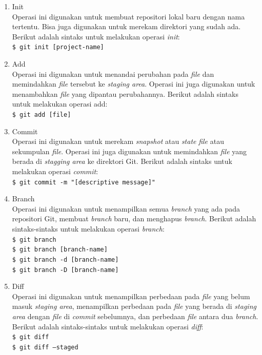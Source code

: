 \begin{enumerate}
\item Init\\
Operasi ini digunakan untuk membuat repositori lokal baru dengan nama tertentu. Bisa juga digunakan untuk merekam direktori yang sudah ada. Berikut adalah sintaks untuk melakukan operasi  \textit{init}:\\
\texttt{\$ git init [project-name]}  
\item Add\\
Operasi ini digunakan untuk menandai perubahan pada \textit{file} dan memindahkan \textit{file} tersebut ke \textit{staging area}. Operasi ini juga digunakan untuk menambahkan \textit{file} yang dipantau perubahannya. Berikut adalah sintaks untuk melakukan operasi add:\\
\texttt{\$ git add [file]}  
\item Commit\\
Operasi ini digunakan untuk merekam \textit{snapshot} atau \textit{state} \textit{file} atau sekumpulan \textit{file}. Operasi ini juga digunakan untuk memindahkan \textit{file} yang berada di \textit{stagging area} ke direktori Git. Berikut adalah sintaks untuk melakukan operasi \textit{commit}:\\
\texttt{\$ git commit -m "[descriptive message]"}  
\item Branch\\
Operasi ini digunakan untuk menampilkan semua \textit{branch} yang ada pada repositori Git, membuat \textit{branch} baru, dan menghapus \textit{branch}. Berikut adalah sintaks-sintaks untuk melakukan operasi \textit{branch}:\\
\texttt{\$ git branch}\\ 
\texttt{\$ git branch [branch-name]}\\
\texttt{\$ git branch -d [branch-name]}\\
\texttt{\$ git branch -D [branch-name]} 
\item Diff\\
Operasi ini digunakan untuk menampilkan perbedaan pada \textit{file} yang belum masuk \textit{staging area}, menampilkan perbedaan pada \textit{file} yang berada di \textit{staging area} dengan \textit{file} di \textit{commit} sebelumnya, dan perbedaan \textit{file} antara dua \textit{branch}.  Berikut adalah sintaks-sintaks untuk melakukan operasi \textit{diff}:\\
\texttt{\$ git diff} \\
\texttt{\$ git diff --staged}\\

\end{enumerate}

